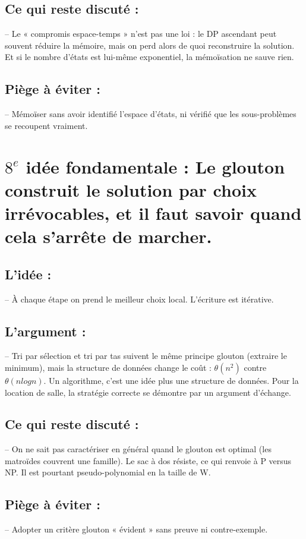 \documentclass{article}
\begin{document}
\subsection*{\textbf{Ce qui reste discuté} :}
\qquad -- Le « compromis espace-temps » n'est pas une loi : le DP ascendant peut souvent réduire la mémoire, mais on perd alors de quoi reconstruire la solution. Et si le nombre d'états est lui-même exponentiel, la mémoïsation ne sauve rien.


\subsection*{\textbf{Piège à éviter} :}
\qquad -- Mémoïser sans avoir identifié l'espace d'états, ni vérifié que les sous-problèmes se recoupent vraiment.

\section*{\textbf{$8^e$ idée fondamentale} : Le glouton construit le solution par choix irrévocables, et il faut savoir quand cela s'arrête de marcher.}

\subsection*{\textbf{L'idée} :}
\qquad -- À chaque étape on prend le meilleur choix local. L'écriture est itérative.


\subsection*{\textbf{L'argument} :}
\qquad -- Tri par sélection et tri par tas suivent le même principe glouton (extraire le minimum), mais la structure de données change le coût : $\theta(n^2)$ contre $\theta(nlog n)$. Un algorithme, c'est une idée plus une structure de données. Pour la location de salle, la stratégie correcte se démontre par un argument d'échange.


\subsection*{\textbf{Ce qui reste discuté} :}
\qquad -- On ne sait pas caractériser en général quand le glouton est optimal (les matroïdes couvrent une famille). Le sac à dos résiste, ce qui renvoie à P versus NP. Il est pourtant pseudo-polynomial en la taille de W. 


\subsection*{\textbf{Piège à éviter} :}
\qquad -- Adopter un critère glouton « évident » sans preuve ni contre-exemple.
\end{document}
